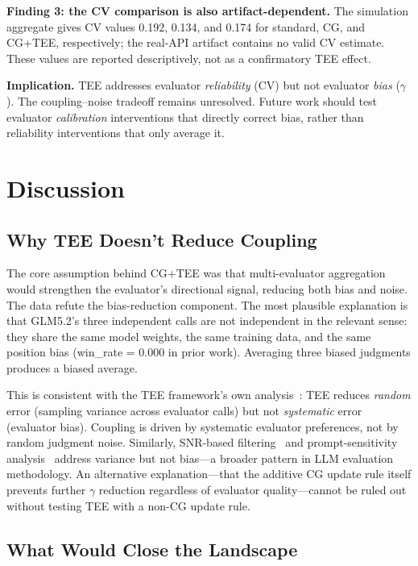 \documentclass[11pt]{article}
\begin{document}
\textbf{Finding 3: the CV comparison is also artifact-dependent.} The simulation aggregate gives CV values 0.192, 0.134, and 0.174 for standard, CG, and CG+TEE, respectively; the real-API artifact contains no valid CV estimate. These values are reported descriptively, not as a confirmatory TEE effect.

\textbf{Implication.} TEE addresses evaluator \textit{reliability} (CV) but not evaluator \textit{bias} ($\gamma$). The coupling--noise tradeoff remains unresolved. Future work should test evaluator \textit{calibration} interventions that directly correct bias, rather than reliability interventions that only average it.

\section{Discussion}

\subsection{Why TEE Doesn't Reduce Coupling}

The core assumption behind CG+TEE was that multi-evaluator aggregation would strengthen the evaluator's directional signal, reducing both bias and noise. The data refute the bias-reduction component. The most plausible explanation is that GLM5.2's three independent calls are not independent in the relevant sense: they share the same model weights, the same training data, and the same position bias (win\_rate = 0.000 in prior work). Averaging three biased judgments produces a biased average.

This is consistent with the TEE framework's own analysis~\cite{messing2026tee}: TEE reduces \textit{random} error (sampling variance across evaluator calls) but not \textit{systematic} error (evaluator bias). Coupling is driven by systematic evaluator preferences, not by random judgment noise. Similarly, SNR-based filtering~\cite{heineman2025snr} and prompt-sensitivity analysis~\cite{sclar2024quantifying} address variance but not bias---a broader pattern in LLM evaluation methodology. An alternative explanation---that the additive CG update rule itself prevents further $\gamma$ reduction regardless of evaluator quality---cannot be ruled out without testing TEE with a non-CG update rule.

\subsection{What Would Close the Landscape}
\end{document}
